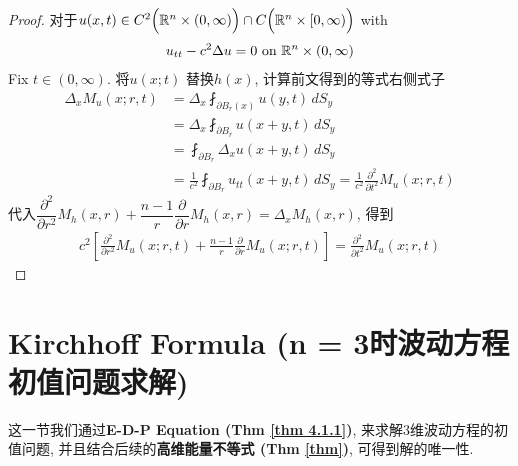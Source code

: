 \begin{thm}
\begin{proof}
			\newpage
			
			对于$u(x , t) \in C^2\Big( \mathbb{R}^n \times (0 , \infty) \Big) \cap C \Big( \mathbb{R}^n \times [0 , \infty) \Big)$ with 
			\begin{align*}
				u_{tt} - c^2 \Delta u = 0 \,\, \text{on} \,\, \mathbb{R}^n \times (0 , \infty)
			\end{align*}
			Fix $t \in (0 , \infty)$. 将$u(x ; t)$ 替换$h(x)$, 计算前文得到的等式右侧式子
			\begin{align*}
				\Delta_x M_u(x ; r , t) 
				&= \Delta_x \fint_{\partial B_r(x)} u(y , t) \, dS_y \\
				&= \Delta_x \fint_{\partial B_r} u(x + y , t) \, dS_y \\
				&= \fint_{\partial B_r} \Delta_x u(x + y , t) \, dS_y \\
				&= \frac{1}{c^2} \fint_{\partial B_r} u_{tt} (x + y , t) \, dS_y 
				= \frac{1}{c^2} \frac{\partial^2}{\partial t^2} M_{u}(x ; r , t)
			\end{align*}
			代入$\dfrac{\partial^2}{\partial r^2} M_h(x , r) + \dfrac{n - 1}{r} \dfrac{\partial}{\partial r} M_h(x , r) 
			= \Delta_x M_h(x , r)$, 得到
			\begin{align*}
				c^2 \left[ \frac{\partial^2}{\partial r^2} M_{u}(x ; r , t) + \frac{n - 1}{r} \frac{\partial}{\partial r} M_u(x ; r , t) \right] 
				= \frac{\partial^2}{\partial t^2} M_u(x ; r , t)
			\end{align*}
		\end{proof}
	\end{thm}
	
\newpage
	
\section{Kirchhoff Formula (n = 3时波动方程初值问题求解)}
	
	\vspace*{2em}
	
	这一节我们通过\textbf{E-D-P Equation (Thm \ref{thm 4.1.1})}, 来求解3维波动方程的初值问题, 并且结合后续的\textbf{高维能量不等式 (Thm \ref{thm})}, 可得到解的唯一性. 
	
	\vspace*{10em}
	
